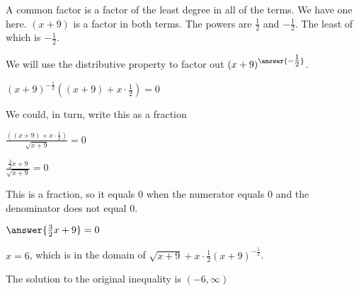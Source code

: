 \documentclass{ximera}
\begin{document}
\begin{example}
\begin{explanation}
A common factor is a factor of the least degree in all of the terms.  We have one here. $(x+9)$ is a factor in both terms.  The powers are $\frac{1}{2}$ and $-\frac{1}{2}$. The least of which is $-\frac{1}{2}$.

We will use the distributive property to factor out $(x+9)^{\answer{-\tfrac{1}{2}}}$.


$(x+9)^{-\tfrac{1}{2}} \left((x+9) + x \cdot \frac{1}{2}\right)  = 0$


We could, in turn, write this as a fraction


$\frac{\left((x+9) + x \cdot \frac{1}{2}\right)}{\sqrt{x+9}} = 0$


$\frac{ \frac{3}{2} x + 9}{\sqrt{x+9}} = 0$



This is a fraction, so it equals $0$ when the numerator equals $0$ and the denominator does not equal $0$.


$\answer{\frac{3}{2} x + 9} = 0$



$x = 6$, which is in the domain of $\sqrt{x+9} + x \cdot \frac{1}{2} (x+9)^{-\tfrac{1}{2}}$.



The solution to the original inequality is $(-6, \infty)$


\end{explanation}

\end{example}
\end{document}
